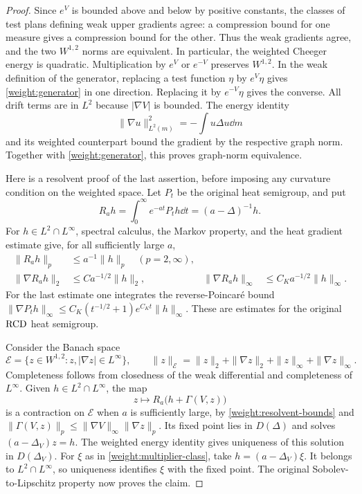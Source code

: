 \begin{proof}
Since \(e^V\) is bounded above and below by positive constants,
the classes of test plans defining weak upper gradients agree:
a compression bound for one measure gives a compression bound
for the other. Thus the weak gradients agree, and the two
\(W^{1,2}\) norms are equivalent. In particular, the weighted
Cheeger energy is quadratic. Multiplication by \(e^V\) or
\(e^{-V}\) preserves \(W^{1,2}\). In the weak definition of the
generator, replacing a test function \(\eta\) by \(e^V\eta\)
gives \eqref{weight:generator} in one direction. Replacing it by
\(e^{-V}\eta\) gives the converse. All drift terms are in \(L^2\)
because \(|\nabla V|\) is bounded.
The energy identity
\[
\|\nabla u\|_{L^2(m)}^2=-\int u\Delta u\dd m
\]
and its weighted counterpart bound the gradient by the respective
graph norm. Together with \eqref{weight:generator}, this proves
graph-norm equivalence.

Here is a resolvent proof of the last assertion, before imposing
any curvature condition on the weighted space. Let \(P_t\) be
the original heat semigroup, and put
\[
R_a h=\int_0^\infty e^{-at}P_t h\dd t=(a-\Delta)^{-1}h.
\]
For \(h\in L^2\cap L^\infty\), spectral calculus, the Markov
property, and the heat gradient estimate give, for all sufficiently
large \(a\),
\begin{align}
\label{weight:resolvent-bounds}
\|R_a h\|_p&\le a^{-1}\|h\|_p\quad(p=2,\infty),\\
\|\nabla R_a h\|_2&\le C a^{-1/2}\|h\|_2,
&\|\nabla R_a h\|_\infty&\le C_Ka^{-1/2}\|h\|_\infty.
\nonumber
\end{align}
For the last estimate one integrates the reverse-Poincar\'e
bound \(\|\nabla P_t h\|_\infty\le
C_K(t^{-1/2}+1)e^{C_Kt}\|h\|_\infty\).
These are estimates for the original \(\mathrm{RCD}\) heat semigroup.

Consider the Banach space
\[
\mathcal E=\{z\in W^{1,2}:z,|\nabla z|\in L^\infty\},\qquad
\|z\|_{\mathcal E}=\|z\|_2+\|\nabla z\|_2
                         +\|z\|_\infty+\|\nabla z\|_\infty.
\]
Completeness follows from closedness of the weak differential
and completeness of \(L^\infty\). Given \(h\in L^2\cap L^\infty\),
the map
\[
z\longmapsto R_a\bigl(h+\Gamma(V,z)\bigr)
\]
is a contraction on \(\mathcal E\) when \(a\) is sufficiently
large, by \eqref{weight:resolvent-bounds} and
\(\|\Gamma(V,z)\|_p\le\|\nabla V\|_\infty\|\nabla z\|_p\).
Its fixed point lies in \(D(\Delta)\) and solves
\((a-\Delta_V)z=h\). The weighted energy identity gives
uniqueness of this solution in \(D(\Delta_V)\).
For \(\xi\) as in \eqref{weight:multiplier-class}, take
\(h=(a-\Delta_V)\xi\). It belongs to \(L^2\cap L^\infty\),
so uniqueness identifies \(\xi\) with the fixed point.
The original Sobolev-to-Lipschitz property now proves the claim.
\end{proof}

